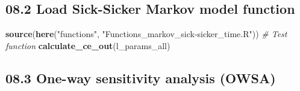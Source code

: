 \documentclass[
]{article}
\newenvironment{Shaded}{\begin{snugshade}}{\end{snugshade}}
\newcommand{\CommentTok}[1]{\textcolor[rgb]{0.56,0.35,0.01}{\textit{#1}}}
\newcommand{\KeywordTok}[1]{\textcolor[rgb]{0.13,0.29,0.53}{\textbf{#1}}}
\newcommand{\NormalTok}[1]{#1}
\newcommand{\StringTok}[1]{\textcolor[rgb]{0.31,0.60,0.02}{#1}}
\begin{document}
\hypertarget{load-sick-sicker-markov-model-function}{%
\subsection{08.2 Load Sick-Sicker Markov model
function}\label{load-sick-sicker-markov-model-function}}

\begin{Shaded}
\begin{Highlighting}[]
\KeywordTok{source}\NormalTok{(}\KeywordTok{here}\NormalTok{(}\StringTok{"functions"}\NormalTok{, }\StringTok{"Functions_markov_sick-sicker_time.R"}\NormalTok{))}
\CommentTok{# Test function}
\KeywordTok{calculate_ce_out}\NormalTok{(l_params_all)}
\end{Highlighting}
\end{Shaded}

\hypertarget{one-way-sensitivity-analysis-owsa}{%
\subsection{08.3 One-way sensitivity analysis
(OWSA)}\label{one-way-sensitivity-analysis-owsa}}
\end{document}
